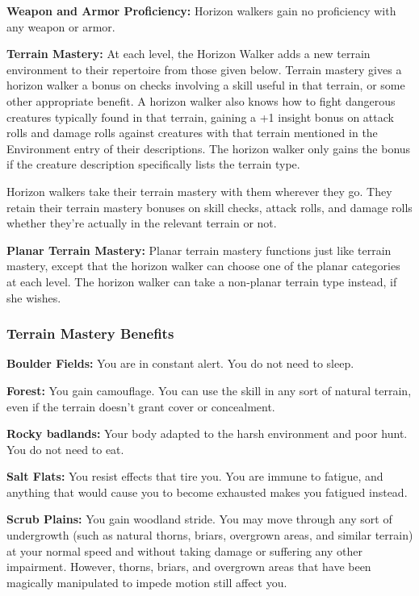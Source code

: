 {
\textbf{Weapon and Armor Proficiency:} Horizon walkers gain no proficiency with any weapon or armor.

\textbf{Terrain Mastery:} At each level, the Horizon Walker adds a new terrain environment to their repertoire from those given below. Terrain mastery gives a horizon walker a bonus on checks involving a skill useful in that terrain, or some other appropriate benefit. A horizon walker also knows how to fight dangerous creatures typically found in that terrain, gaining a +1 insight bonus on attack rolls and damage rolls against creatures with that terrain mentioned in the Environment entry of their descriptions. The horizon walker only gains the bonus if the creature description specifically lists the terrain type.

Horizon walkers take their terrain mastery with them wherever they go. They retain their terrain mastery bonuses on skill checks, attack rolls, and damage rolls whether they're actually in the relevant terrain or not.

\textbf{Planar Terrain Mastery:} Planar terrain mastery functions just like terrain mastery, except that the horizon walker can choose one of the planar categories at each level. The horizon walker can take a non-planar terrain type instead, if she wishes.

\subsubsection{Terrain Mastery Benefits}

\textbf{Boulder Fields:} You are in constant alert. You do not need to sleep.

\textbf{Forest:} You gain camouflage. You can use the  skill in any sort of natural terrain, even if the terrain doesn't grant cover or concealment.

\textbf{Rocky badlands:} Your body adapted to the harsh environment and poor hunt. You do not need to eat.

\textbf{Salt Flats:} You resist effects that tire you. You are immune to fatigue, and anything that would cause you to become exhausted makes you fatigued instead.

\textbf{Scrub Plains:} You gain woodland stride. You may move through any sort of undergrowth (such as natural thorns, briars, overgrown areas, and similar terrain) at your normal speed and without taking damage or suffering any other impairment. However, thorns, briars, and overgrown areas that have been magically manipulated to impede motion still affect you.

}
